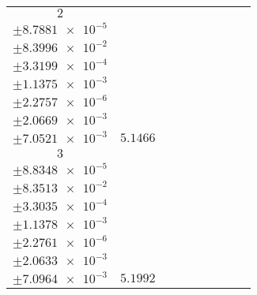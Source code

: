 \documentclass[8pt]{article}
\begin{document}
\begin{longtable}[l]{c c c c c c c c c}
$\num{2}$ & \begin{tabular}[c]{@{}c@{}}$\num{6.0499e-2}$ \\ $\pm\num{8.7881e-5}$\end{tabular} & \begin{tabular}[c]{@{}c@{}}$\num{0.1443}$ \\ $\pm\num{8.3996e-2}$\end{tabular} & \begin{tabular}[c]{@{}c@{}}$\num{-4.4396}$ \\ $\pm\num{3.3199e-4}$\end{tabular} & \begin{tabular}[c]{@{}c@{}}$\num{1.33e+3}$ \\ $\pm\num{1.1375e-3}$\end{tabular} & \begin{tabular}[c]{@{}c@{}}$\num{2.6607}$ \\ $\pm\num{2.2757e-6}$\end{tabular} & \begin{tabular}[c]{@{}c@{}}$\num{1.173}$ \\ $\pm\num{2.0669e-3}$\end{tabular} & \begin{tabular}[c]{@{}c@{}}$\num{4.2025}$ \\ $\pm\num{7.0521e-3}$\end{tabular} & $\num{5.1466}$\\
$\num{3}$ & \begin{tabular}[c]{@{}c@{}}$\num{6.1039e-2}$ \\ $\pm\num{8.8348e-5}$\end{tabular} & \begin{tabular}[c]{@{}c@{}}$\num{0.17438}$ \\ $\pm\num{8.3513e-2}$\end{tabular} & \begin{tabular}[c]{@{}c@{}}$\num{4.4379}$ \\ $\pm\num{3.3035e-4}$\end{tabular} & \begin{tabular}[c]{@{}c@{}}$\num{1.3389e+3}$ \\ $\pm\num{1.1378e-3}$\end{tabular} & \begin{tabular}[c]{@{}c@{}}$\num{2.6785}$ \\ $\pm\num{2.2761e-6}$\end{tabular} & \begin{tabular}[c]{@{}c@{}}$\num{1.1746}$ \\ $\pm\num{2.0633e-3}$\end{tabular} & \begin{tabular}[c]{@{}c@{}}$\num{4.235}$ \\ $\pm\num{7.0964e-3}$\end{tabular} & $\num{5.1992}$\\

\end{longtable}
\end{document}
